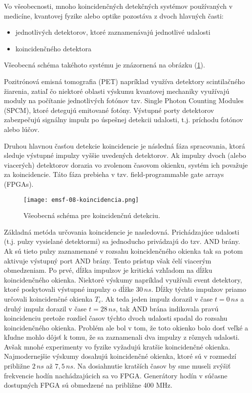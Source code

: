 \documentclass[../../main.tex]{subfiles}
\begin{document}
Vo všeobecnosti, mnoho koincidenčných detekčných systémov používaných v medicíne, kvantovej fyzike alebo optike pozostáva z dvoch hlavných časti: 
\begin{itemize}
\item jednotlivých detektorov, ktoré zaznamenávajú jednotlivé udalosti 
\item koincidenčného detektora
\end{itemize}
Všeobecná schéma takéhoto systému je znázornená na obrázku (\ref{em8:fig:koncidencia}). 

Pozitrónová emisná tomografia (PET) napríklad využíva detektory scintilačného žiarenia, zatiaľ čo niektoré oblasti výskumu kvantovej mechaniky využívajú moduly na počítanie jednotlivých fotónov tzv. Single Photon Counting Modules (SPCM), ktoré detegujú emitované fotóny. Výstupné porty detektorov zabezpečujú signálny impulz po úspešnej detekcii udalosti, t.j. príchodu fotónov alebo lúčov.

Druhou hlavnou časťou detekcie koincidencie je následná fáza spracovania, ktorá sleduje výstupné impulzy vyššie uvedených detektorov. Ak impulzy dvoch (alebo viacerých) detektorov dorazia vo zvolenom časovom okienku, systém ich považuje za koincidencie.
Táto fáza prebieha v tzv. field-programmable gate arrays (FPGAs).

\begin{figure}[!h]
\texttt{[image: emsf-08-koincidencia.png]}
\centering
\caption{Všeobecná schéma pre koincidenčnú detekciu.}
\label{em8:fig:koncidencia}
\end{figure}

Základná metóda určovania koincidencie je nasledovná. Prichádzajúce udalosti (t.j. pulzy vysielané detektormi) sa jednoducho privádzajú do tzv. AND brány. Ak sú tieto pulzy zaznamenané v rozsahu koincidenčného okienka tak sa potom aktivuje výstupný port AND brány. Tento prístup však čelí viacerým obmedzeniam. Po prvé, dĺžka impulzov je kritická vzhľadom na dĺžku koincidenčného okienka. Niektoré výskumy napríklad využívali event detektory, ktoré poskytovali výstupné impulzy o dĺžke $30\,ns$. Dĺžky týchto impulzov priamo určovali koincidenčné okienka $T_c$. Ak teda jeden impulz dorazil v čase $t=0\,ns$ a druhý impulz dorazil v čase $t=28\,ns$, tak AND brána indikovala pravú koincidenciu pretože rozdiel časov týchto dvoch udalosti spadal do rozsahu koincidenčného okienka. Problém ale bol v tom, že toto okienko bolo dosť veľké a kľudne mohlo dôjsť k tomu, že sa zaznamenali dva impulzy z rôznych udalosti. Avšak mnohé experimenty vo fyzike vyžadujú kratšie koincidenčné okienka. Najmodernejšie výskumy dosahujú koincidenčné okienka, ktoré sú v rozmedzí približne $2\,ns$ až $7,5\,ns$. Na dosiahnutie kratších časov by sme museli zvýšiť frekvencie hodín nachádzajúcich sa vo FPGA. Generátory hodín v súčasne dostupných FPGA sú obmedzené na približne 400 MHz. 
\end{document}
